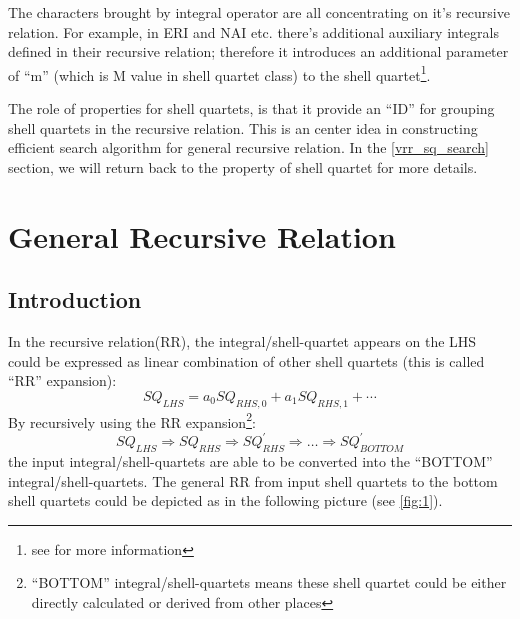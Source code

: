 The characters brought by integral operator are all concentrating on it's 
recursive relation. For example, in ERI and NAI etc. there's additional 
auxiliary integrals defined in their recursive relation; therefore it 
introduces an additional parameter of ``m'' (which is M value in shell quartet
class) to the shell quartet\footnote{see \cite{OS1986} for more information}.

The role of properties for shell quartets, is that it provide an ``ID'' for 
grouping shell quartets in the recursive relation. This is an center idea
in constructing efficient search algorithm for general recursive relation.
In the \ref{vrr_sq_search} section, we will return back to the property of 
shell quartet for more details. 

\section{General Recursive Relation}
%
%
%
\subsection{Introduction}
%
%
%
\label{rr_introduction}

In the recursive relation(RR), the integral/shell-quartet
appears on the LHS could be expressed as linear combination of 
other shell quartets (this is called ``RR'' expansion)\cite{OS1986,
OS1988, HGP, new_hrr_Schaefer, lindh1991reduced, PRISM, johnson1993efficient, 
gill1994molecular}:
\begin{equation}
 SQ_{LHS} = a_{0}SQ_{RHS,0} + a_{1}SQ_{RHS,1} + \cdots
\end{equation}
By recursively using the RR expansion\footnote{``BOTTOM'' 
integral/shell-quartets means these shell quartet could be either 
directly calculated or derived from other places}:
\begin{equation}
 SQ_{LHS} \Rightarrow SQ_{RHS} \Rightarrow SQ^{'}_{RHS} \Rightarrow
 \dots \Rightarrow SQ^{'}_{BOTTOM}
\end{equation}
the input integral/shell-quartets are able to be converted into the 
``BOTTOM'' integral/shell-quartets. The general RR from input 
shell quartets to the bottom shell quartets could be 
depicted as in the following picture (see \ref{fig:1}).

